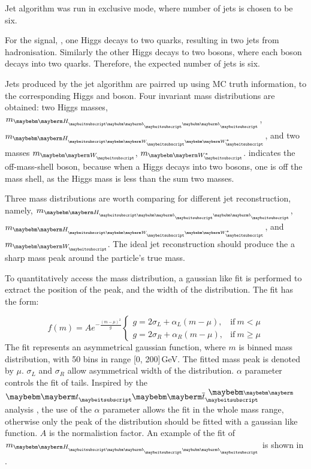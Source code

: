 Jet algorithm was run in exclusive mode, where number of jets is chosen to be six.

For the signal, \eeToHHbbWWHad, one Higgs decays to two \Pbottom quarks, resulting in two jets from hadronisation. Similarly the other Higgs decays to two \PW bosons, where each \PW boson decays into two quarks. Therefore, the expected number of jets is six.

Jets produced by the \kt jet algorithm are pairred up using MC truth information, to the corresponding Higgs and \PW boson. Four invariant mass distributions are obtained: two Higgs masses, $m_{\Hbb}$, $m_{\HWW}$, and two \PW masses $m_{\PW}$, $m_{\W*}$. \W* indicates the off-mass-shell \PW boson, because when a Higgs decays into two \PW bosons, one \PW is off the mass shell, as the Higgs mass is less than the sum two \PW masses.



Three mass distributions are worth comparing for different jet reconstruction, namely, $m_{\Hbb}$, $m_{\HWW}$, and $m_{\PW}$. The ideal jet reconstruction should produce the a sharp mass peak around the particle's true mass.

To quantitatively access the mass distribution, a gaussian like fit is performed to extract the position of the peak, and the width of the distribution. The fit has the form:

\begin{equation}
f(m)=A e^{- \frac{(m - \mu)^2}{g}}
\begin{cases}
  g = 2\sigma_L + \alpha_L(m - \mu), & \text{if}\ m < \mu\\
  g = 2\sigma_R + \alpha_R(m - \mu), & \text{if}\ m \geqslant \mu
\end{cases}
\end{equation}
The fit represents an asymmetrical gaussian function, where $m$ is binned mass distribution, with 50 bins in range [0, 200]\,GeV. The fitted mass peak is denoted by $\mu$. $\sigma_L$ and $\sigma_R$ allow asymmetrical width of the distribution. $\alpha$ parameter controls the fit of tails. Inspired by the $\Ptop\APtop$  analysis \cite{}, the use of the $\alpha$ parameter allows the fit in the whole mass range, otherwise only the peak of the distribution should be fitted with a gaussian like function. $A$ is the normalistion factor. An example of the fit of $m_{\Hbb}$ is shown in .

